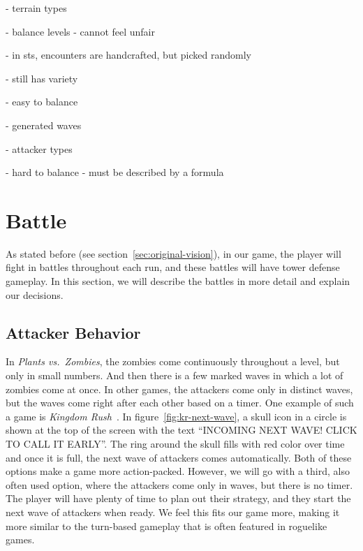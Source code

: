 - terrain types

- balance levels - cannot feel unfair

- in sts, encounters are handcrafted, but picked randomly

- still has variety

- easy to balance

- generated waves

- attacker types

- hard to balance - must be described by a formula

\section{Battle}

As stated before (see section~\ref{sec:original-vision}), in our game, the player will fight in battles throughout each run, and these battles will have tower defense gameplay.
In this section, we will describe the battles in more detail and explain our decisions.

\subsection{Attacker Behavior}

In \emph{Plants vs.\ Zombies}, the zombies come continuously throughout a level, but only in small numbers.
And then there is a few marked waves in which a lot of zombies come at once.
In other games, the attackers come only in distinct waves, but the waves come right after each other based on a timer.
One example of such a game is \emph{Kingdom Rush}~\cite{kingdomRush}.
In figure~\ref{fig:kr-next-wave}, a skull icon in a circle is shown at the top of the screen with the text \enquote{INCOMING NEXT WAVE! CLICK TO CALL IT EARLY}.
The ring around the skull fills with red color over time and once it is full, the next wave of attackers comes automatically.
Both of these options make a game more action-packed.
However, we will go with a third, also often used option, where the attackers come only in waves, but there is no timer.
The player will have plenty of time to plan out their strategy, and they start the next wave of attackers when ready.
We feel this fits our game more, making it more similar to the turn-based gameplay that is often featured in roguelike games.

